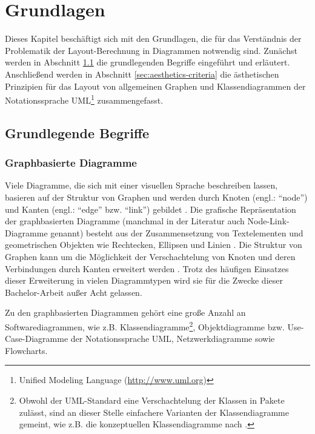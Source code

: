 
\chapter{Grundlagen}
\label{chapter:basics}

Dieses Kapitel beschäftigt sich mit den Grundlagen, die für das Verständnis der Problematik der Layout-Berechnung in Diagrammen notwendig sind. Zunächst werden in Abschnitt \ref{sec:disambiguation} die grundlegenden Begriffe eingeführt und erläutert. Anschließend werden in Abschnitt \ref{sec:aesthetics-criteria} die ästhetischen Prinzipien für das Layout von allgemeinen Graphen und Klassendiagrammen der Notationssprache UML\footnote{Unified Modeling Language (\url{http://www.uml.org})} zusammengefasst.

\section{Grundlegende Begriffe}
\label{sec:disambiguation}

\subsection{Graphbasierte Diagramme}
\label{subsec:graph-based-diagrams}

Viele Diagramme, die sich mit einer visuellen Sprache beschreiben lassen, basieren auf der Struktur von Graphen und werden durch Knoten (engl.: \enquote{node}) und Kanten (engl.: \enquote{edge} bzw. \enquote{link}) gebildet \cite{Eichelberger05Aesthetics}. Die grafische Repräsentation der graphbasierten Diagramme (manchmal in der Literatur auch Node-Link-Diagramme genannt) besteht aus der Zusammensetzung von Textelementen und geometrischen Objekten wie Rechtecken, Ellipsen und Linien \cite{Wybrow08Using}. Die Struktur von Graphen kann um die Möglichkeit der Verschachtelung von Knoten und deren Verbindungen durch Kanten erweitert werden \cite{Siebenhaller03Automatisches, Wybrow08Using}. Trotz des häufigen Einsatzes dieser Erweiterung in vielen Diagrammtypen wird sie für die Zwecke dieser Bachelor-Arbeit außer Acht gelassen.

Zu den graphbasierten Diagrammen gehört eine große Anzahl an Softwarediagrammen, wie z.B. Klassendiagramme\footnote{Obwohl der UML-Standard eine Verschachtelung der Klassen in Pakete zulässt, sind an dieser Stelle einfachere Varianten der Klassendiagramme gemeint, wie z.B. die konzeptuellen Klassendiagramme nach \cite{Ambler04UML-2-Class}.}, Objektdiagramme bzw. Use-Case-Diagramme der Notationssprache UML, Netzwerkdiagramme sowie Flowcharts.

